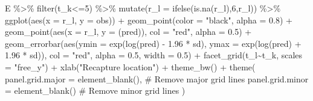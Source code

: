 \documentclass[
  letterpaper,
  DIV=11,
  numbers=noendperiod]{scrartcl}
\newenvironment{Shaded}{\begin{snugshade}}{\end{snugshade}}
\newcommand{\AttributeTok}[1]{\textcolor[rgb]{0.40,0.45,0.13}{#1}}
\newcommand{\CommentTok}[1]{\textcolor[rgb]{0.37,0.37,0.37}{#1}}
\newcommand{\DecValTok}[1]{\textcolor[rgb]{0.68,0.00,0.00}{#1}}
\newcommand{\FloatTok}[1]{\textcolor[rgb]{0.68,0.00,0.00}{#1}}
\newcommand{\FunctionTok}[1]{\textcolor[rgb]{0.28,0.35,0.67}{#1}}
\newcommand{\NormalTok}[1]{\textcolor[rgb]{0.00,0.23,0.31}{#1}}
\newcommand{\SpecialCharTok}[1]{\textcolor[rgb]{0.37,0.37,0.37}{#1}}
\newcommand{\StringTok}[1]{\textcolor[rgb]{0.13,0.47,0.30}{#1}}
\begin{document}
\begin{Shaded}
\begin{Highlighting}[]
\NormalTok{E }\SpecialCharTok{\%\textgreater{}\%}
  \FunctionTok{filter}\NormalTok{(t\_k}\SpecialCharTok{\textless{}=}\DecValTok{5}\NormalTok{) }\SpecialCharTok{\%\textgreater{}\%}
  \FunctionTok{mutate}\NormalTok{(}\AttributeTok{r\_l =} \FunctionTok{ifelse}\NormalTok{(}\FunctionTok{is.na}\NormalTok{(r\_l),}\DecValTok{6}\NormalTok{,r\_l)) }\SpecialCharTok{\%\textgreater{}\%}
  \FunctionTok{ggplot}\NormalTok{(}\FunctionTok{aes}\NormalTok{(}\AttributeTok{x =}\NormalTok{ r\_l, }\AttributeTok{y =}\NormalTok{ obs)) }\SpecialCharTok{+}
  \FunctionTok{geom\_point}\NormalTok{(}\AttributeTok{color =} \StringTok{"black"}\NormalTok{, }\AttributeTok{alpha =} \FloatTok{0.8}\NormalTok{) }\SpecialCharTok{+}
  \FunctionTok{geom\_point}\NormalTok{(}\FunctionTok{aes}\NormalTok{(}\AttributeTok{x =}\NormalTok{ r\_l, }\AttributeTok{y =}\NormalTok{ (pred)), }\AttributeTok{col =} \StringTok{"red"}\NormalTok{, }\AttributeTok{alpha =} \FloatTok{0.5}\NormalTok{) }\SpecialCharTok{+}
  \FunctionTok{geom\_errorbar}\NormalTok{(}\FunctionTok{aes}\NormalTok{(}\AttributeTok{ymin =} \FunctionTok{exp}\NormalTok{(}\FunctionTok{log}\NormalTok{(pred) }\SpecialCharTok{{-}} \FloatTok{1.96} \SpecialCharTok{*}\NormalTok{ sd), }\AttributeTok{ymax =} \FunctionTok{exp}\NormalTok{(}\FunctionTok{log}\NormalTok{(pred) }\SpecialCharTok{+} \FloatTok{1.96} \SpecialCharTok{*}\NormalTok{ sd)), }\AttributeTok{col =} \StringTok{"red"}\NormalTok{, }\AttributeTok{alpha =} \FloatTok{0.5}\NormalTok{, }\AttributeTok{width =} \FloatTok{0.5}\NormalTok{) }\SpecialCharTok{+}
  \FunctionTok{facet\_grid}\NormalTok{(t\_l}\SpecialCharTok{\textasciitilde{}}\NormalTok{t\_k, }\AttributeTok{scales =} \StringTok{"free\_y"}\NormalTok{) }\SpecialCharTok{+}
  \FunctionTok{xlab}\NormalTok{(}\StringTok{"Recapture location"}\NormalTok{) }\SpecialCharTok{+}
  \FunctionTok{theme\_bw}\NormalTok{() }\SpecialCharTok{+}
  \FunctionTok{theme}\NormalTok{(}
    \AttributeTok{panel.grid.major =} \FunctionTok{element\_blank}\NormalTok{(),  }\CommentTok{\# Remove major grid lines}
    \AttributeTok{panel.grid.minor =} \FunctionTok{element\_blank}\NormalTok{()   }\CommentTok{\# Remove minor grid lines}
\NormalTok{  )}
\end{Highlighting}
\end{Shaded}
\end{document}
